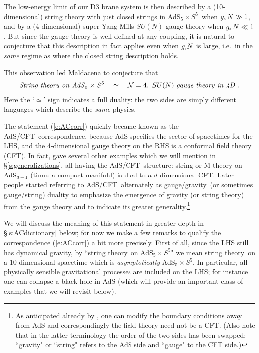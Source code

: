 \documentclass[12pt]{article}
\def\sect#1{\S\ref{#1}}
\def\req#1{(\ref{#1})}
\def\AC{AdS/CFT}
\def\GG{gauge/gravity}
\def\STY{string theory}
\def\gst{g_{\scriptscriptstyle {\rm s}}}
\def\adss#1#2{AdS$_{#1} \times S^{#2}$}
\def\dual{\simeq}
\begin{document}
The low-energy limit of our D3 brane system is then described by a (10-dimensional) string theory with just closed strings in \adss55\ when $\gst \, N \gg 1$, and by a (4-dimensional) super Yang-Mills $SU(N)$ gauge theory when $\gst \, N \ll 1$.  But since the gauge theory is well-defined at any coupling, it is natural to conjecture that this description in fact applies even when $\gst N$ is large, i.e.\ in the {\it same} regime as where the closed string description holds.

This observation led Maldacena \cite{Maldacena:1997re} to conjecture that
%
\begin{equation}
{\it 
String \ theory  \ on  \  AdS}_5 \times S^5
\quad \dual \quad
{\cal N} = 4, \ SU(N) \ {\it gauge \ theory \ in \ 4D} \ .
\label{e:ACcorr}
\end{equation}	
%
Here the `$\dual$' sign indicates a full duality:  the two sides are simply  different languages which describe the {\it same} physics. 

The statement \req{e:ACcorr} quickly became known as the \AC\ correspondence, because AdS specifies the sector of spacetimes for the LHS, and the 4-dimensional gauge theory on the RHS is a conformal field theory (CFT).  In fact, \cite{Maldacena:1997re} gave several other examples which we will mention in \sect{s:generalizations}, all having the \AC\ structure: string or M-theory on AdS$_{d+1}$ (times a compact manifold) is dual to a $d$-dimensional CFT.
Later people started referring to \AC\ alternately as \GG\ (or sometimes gauge/string) duality to emphasize the emergence of gravity (or string theory) from the gauge theory and  to indicate its greater generality.\footnote{
As anticipated already by \cite{Maldacena:1997re}, one can modify the boundary conditions away from AdS and correspondingly the field theory need not be a CFT.   (Also note that in the latter terminology the order of the two sides has been swapped:  ``gravity" or ``string" refers to the AdS side and  ``gauge"  to the CFT side.)
}

We will discuss the meaning of this statement in greater depth in  \sect{s:ACdictionary} below; for now we make a few remarks to qualify the correspondence \req{e:ACcorr} a bit more precisely.  First of all, since the LHS still has dynamical gravity, by ``\STY\ on \adss55" we mean \STY\ on a 10-dimensional spacetime which is {\it asymptotically} \adss55.  In particular, all physically sensible gravitational processes are included on the LHS; for instance one can collapse a black hole in AdS (which will provide an important class of examples that we will revisit below).
\end{document}
